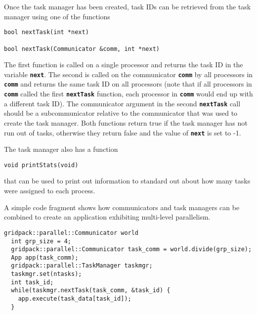 Once the task manager has been created, task IDs can be retrieved from the task manager using one of the functions

{
\color{red}
\begin{Verbatim}[fontseries=b]
bool nextTask(int *next)

bool nextTask(Communicator &comm, int *next)
\end{Verbatim}
}

The first function is called on a single processor and returns the task ID in the variable \texttt{\textbf{next}}. The second is called on the communicator \texttt{\textbf{comm}} by all processors in \texttt{\textbf{comm}} and returns the same task ID on all processors (note that if all processors in \texttt{\textbf{comm}} called the first \texttt{\textbf{nextTask}} function, each processor in \texttt{\textbf{comm}} would end up with a different task ID). The communicator argument in the second \texttt{\textbf{nextTask}} call should be a subcommunicator relative to the communicator that was used to create the task manager. Both functions return true if the task manager has not run out of tasks, otherwise they return false and the value of \texttt{\textbf{next}} is set to -1.

The task manager also has a function

{
\color{red}
\begin{Verbatim}[fontseries=b]
void printStats(void)
\end{Verbatim}
}

that can be used to print out information to standard out about how many tasks were assigned to each process.

A simple code fragment shows how communicators and task managers can be combined to create an application exhibiting multi-level parallelism.

{
\color{red}
\begin{Verbatim}[fontseries=b]
  gridpack::parallel::Communicator world
  int grp_size = 4;
  gridpack::parallel::Communicator task_comm = world.divide(grp_size);
  App app(task_comm);
  gridpack::parallel::TaskManager taskmgr;
  taskmgr.set(ntasks);
  int task_id;
  while(taskmgr.nextTask(task_comm, &task_id) {
    app.execute(task_data[task_id]);
  }
\end{Verbatim}
}


